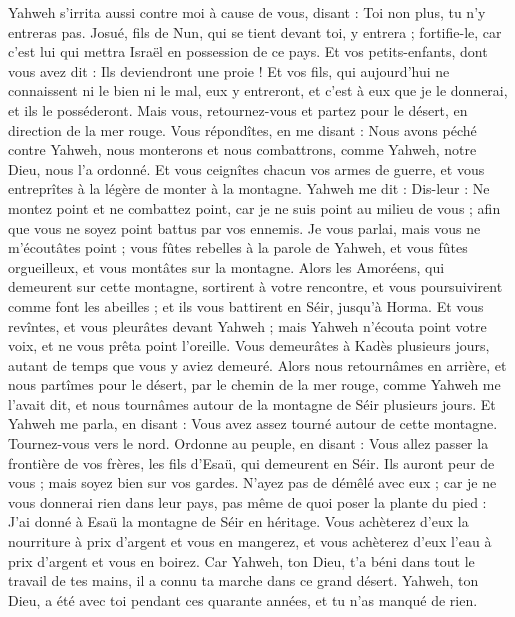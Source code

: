 \begin{multicols}{2}
Yahweh s'irrita aussi contre moi à cause de vous, disant : Toi non plus, tu n’y entreras pas.
Josué, fils de Nun, qui se tient devant toi, y entrera ; fortifie-le, car c'est lui qui mettra Israël en possession de ce pays.
Et vos petits-enfants, dont vous avez dit : Ils deviendront une proie ! Et vos fils, qui aujourd'hui ne connaissent ni le bien ni le mal, eux y entreront, et c’est à eux que je le donnerai, et ils le posséderont.
Mais vous, retournez-vous et partez pour le désert, en direction de la mer rouge.
Vous répondîtes, en me disant : Nous avons péché contre Yahweh, nous monterons et nous combattrons, comme Yahweh, notre Dieu, nous l’a ordonné. Et vous ceignîtes chacun vos armes de guerre, et vous entreprîtes à la légère de monter à la montagne.
Yahweh me dit : Dis-leur : Ne montez point et ne combattez point, car je ne suis point au milieu de vous ; afin que vous ne soyez point battus par vos ennemis.
Je vous parlai, mais vous ne m'écoutâtes point ; vous fûtes rebelles à la parole de Yahweh, et vous fûtes orgueilleux, et vous montâtes sur la montagne.
Alors les Amoréens, qui demeurent sur cette montagne, sortirent à votre rencontre, et vous poursuivirent comme font les abeilles ; et ils vous battirent en Séir, jusqu'à Horma.
Et vous revîntes, et vous pleurâtes devant Yahweh ; mais Yahweh n'écouta point votre voix, et ne vous prêta point l'oreille.
Vous demeurâtes à Kadès plusieurs jours, autant de temps que vous y aviez demeuré.
\VerseOne{}Alors nous retournâmes en arrière, et nous partîmes pour le désert, par le chemin de la mer rouge, comme Yahweh me l'avait dit, et nous tournâmes autour de la montagne de Séir plusieurs jours.
Et Yahweh me parla, en disant :
Vous avez assez tourné autour de cette montagne. Tournez-vous vers le nord.
Ordonne au peuple, en disant : Vous allez passer la frontière de vos frères, les fils d'Esaü, qui demeurent en Séir. Ils auront peur de vous ; mais soyez bien sur vos gardes.
N’ayez pas de démêlé avec eux ; car je ne vous donnerai rien dans leur pays, pas même de quoi poser la plante du pied : J'ai donné à Esaü la montagne de Séir en héritage.
Vous achèterez d'eux la nourriture à prix d'argent et vous en mangerez, et vous achèterez d'eux l’eau à prix d'argent et vous en boirez.
Car Yahweh, ton Dieu, t'a béni dans tout le travail de tes mains, il a connu ta marche dans ce grand désert. Yahweh, ton Dieu, a été avec toi pendant ces quarante années, et tu n'as manqué de rien.

\end{multicols}
